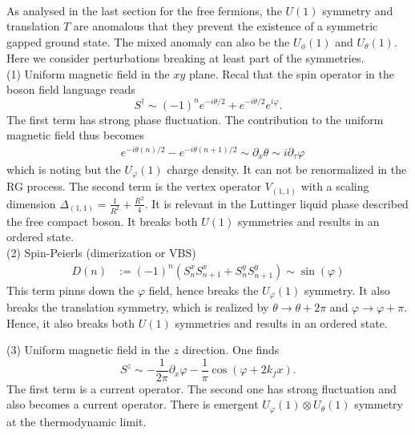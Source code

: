  \\
As analysed in the last section for the free fermions, the $U(1)$ symmetry and translation $T$ are anomalous that they prevent the existence of a symmetric gapped ground state. The mixed anomaly can also be the $U_\phi(1)$ and $U_\theta (1)$. Here we consider perturbations breaking at least part of the symmetries.\\


(1) Uniform magnetic field in the $xy$ plane.
Recal that the spin operator in the boson field language reads
\begin{equation}
	S^\dagger \sim (-1)^n e^{-i\theta/2} + e^{-i\theta/2} e^{i\varphi}.
\end{equation}
The first term has strong phase fluctuation. The contribution to the uniform magnetic field thus becomes
\begin{equation}
	\begin{aligned}
		& e^{-i\theta (n) /2} - e^{-i\theta(n+1)/2} \sim \partial_x \theta \sim i\partial_\tau \varphi
	\end{aligned} 
\end{equation}
which is noting but the $U_\varphi(1)$ charge density. It can not be renormalized in the RG process. The second term is the vertex operator $V_{(1,1)}$ with a scaling dimension $\Delta_{(1,1)} = \frac{1}{R^2} + \frac{R^2}{4}$. It is relevant in the Luttinger liquid phase described the free compact boson. It breaks both $U(1)$ symmetries and results in an ordered state.\\ 
 
(2) Spin-Peierls (dimerization or VBS)
\begin{equation}
	\begin{aligned}
		D(n) & := \left(-1\right)^n \left( S^x_n S^x_{n+1} + S^y_n S^y_{n+1} \right) \sim \sin (\varphi)
	\end{aligned}	
\end{equation}
This term pinns down the $\varphi$ field, hence breaks the $U_\varphi (1)$ symmetry. It also breaks the translation symmetry, which is realized by $\theta \rightarrow \theta + 2\pi$ and $\varphi \rightarrow \varphi + \pi$. Hence, it also breaks both $U(1)$ symmetries and results in an ordered state.

(3) Uniform magnetic field in the $z$ direction.
One finds
\begin{equation}
	S^z \sim - \frac{1}{2\pi}\partial_x \varphi - \frac{1}{\pi}\cos (\varphi + 2k_f x).
\end{equation}
The first term is a current operator. The second one has strong fluctuation and also becomes a current operator. There is emergent $U_\varphi(1) \otimes U_{\theta}(1)$ symmetry at the thermodynamic limit.\\